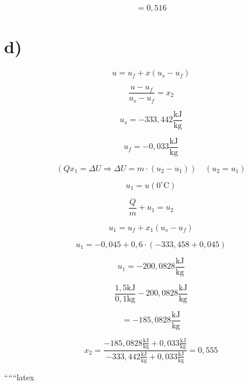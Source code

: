 \[
= 0{,}516
\]

\section*{d)}

\[
u = u_f + x(u_s - u_f)
\]

\[
\frac{u - u_f}{u_s - u_f} = x_2
\]

\[
u_s = -333{,}442 \frac{\text{kJ}}{\text{kg}}
\]

\[
u_f = -0{,}033 \frac{\text{kJ}}{\text{kg}}
\]

\[
(Q x_1 = \Delta U \Rightarrow \Delta U = m \cdot (u_2 - u_1)) \quad (u_2 = u_1)
\]

\[
u_1 = u(0^\circ \text{C})
\]

\[
\frac{Q}{m} + u_1 = u_2
\]

\[
u_1 = u_f + x_1 (u_s - u_f)
\]

\[
u_1 = -0{,}045 + 0{,}6 \cdot (-333{,}458 + 0{,}045)
\]

\[
u_1 = -200{,}0828 \frac{\text{kJ}}{\text{kg}}
\]

\[
\frac{1{,}5 \text{kJ}}{0{,}1 \text{kg}} - 200{,}0828 \frac{\text{kJ}}{\text{kg}}
\]

\[
= -185{,}0828 \frac{\text{kJ}}{\text{kg}}
\]

\[
x_2 = \frac{-185{,}0828 \frac{\text{kJ}}{\text{kg}} + 0{,}033 \frac{\text{kJ}}{\text{kg}}}{-333{,}442 \frac{\text{kJ}}{\text{kg}} + 0{,}033 \frac{\text{kJ}}{\text{kg}}} = 0{,}555
\]

``````latex


